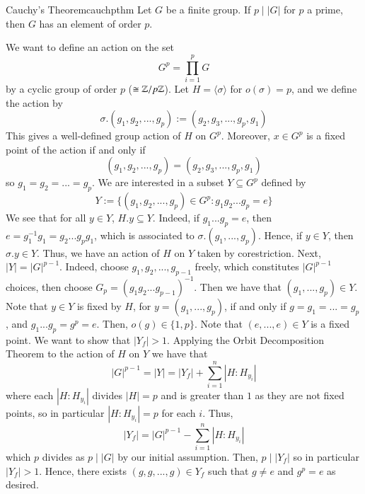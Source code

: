 \documentclass[12pt, a4paper, twoside, openright, titlepage]{book}
\begin{document}
\begin{namthm}{Cauchy's Theorem}{cauchpthm}
        Let $G$ be a finite group. If $p\;\vert\;|G|$ for $p$ a prime, then $G$ has an element of order $p$.
\end{namthm}
\begin{proof*}{}{}
        We want to define an action on the set $$G^p = \prod\limits_{i=1}^pG$$ by a cyclic group of order $p$ ($\cong \mathbb Z/p\mathbb Z$). Let $H = \langle \sigma \rangle$ for $o(\sigma) = p$, and we define the action by \begin{equation}
                \sigma.(g_1,g_2,...,g_p):=(g_2,g_3,...,g_p,g_1)
        \end{equation}
        This gives a well-defined group action of $H$ on $G^p$. Moreover, $x \in G^p$ is a fixed point of the action if and only if \begin{equation}
                (g_1,g_2,...,g_p) = (g_2,g_3,...,g_p,g_1)
        \end{equation}
        so $g_1=g_2=...=g_p$. We are interested in a subset $Y \subseteq G^p$ defined by \begin{equation}
                Y:= \{(g_1,g_2,...,g_p)\in G^p: g_1g_2...g_p = e\}
        \end{equation}
        We see that for all $y \in Y$, $H.y \subseteq Y$. Indeed, if $g_1...g_p = e$, then $e = g_1^{-1}g_1 = g_2...g_pg_1$, which is associated to $\sigma.(g_1,...,g_p)$. Hence, if $y \in Y$, then $\sigma.y \in Y$. Thus, we have an action of $H$ on $Y$ taken by corestriction. Next, $|Y| = |G|^{p-1}$. Indeed, choose $g_1,g_2,...,g_{p-1}$ freely, which constitutes $|G|^{p-1}$ choices, then choose $G_p = (g_1g_2...g_{p-1})^{-1}$. Then we have that $(g_1,...,g_p) \in Y$. Note that $y \in Y$ is fixed by $H$, for $y = (g_1,...,g_p)$, if and only if $g=g_1=...=g_p$, and $g_1...g_p = g^p = e$. Then, $o(g) \in \{1,p\}$. Note that $(e,...,e) \in Y$ is a fixed point. We want to show that $|Y_f| > 1$. Applying the Orbit Decomposition Theorem to the action of $H$ on $Y$ we have that \begin{equation}
                |G|^{p-1} = |Y| = |Y_f| + \sum_{i=1}^n|H:H_{y_i}|
        \end{equation}
        where each $|H:H_{y_i}|$ divides $|H| = p$ and is greater than $1$ as they are not fixed points, so in particular $|H:H_{y_i}| = p$ for each $i$. Thus, \begin{equation}
                |Y_f| = |G|^{p-1} - \sum_{i=1}^n|H:H_{y_i}|
        \end{equation}
        which $p$ divides as $p\;\vert\;|G|$ by our initial assumption. Then, $p\;\vert\;|Y_f|$ so in particular $|Y_f| > 1$. Hence, there exists $(g,g,...,g) \in Y_f$ such that $g \neq e$ and $g^p = e$ as desired.
\end{proof*}
\end{document}
